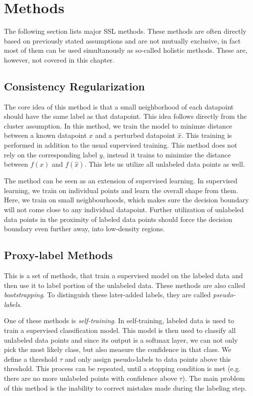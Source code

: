 \section{Methods}
\label{sec:SslMethods}

The following section lists major SSL methods. These methods are often directly based on previously stated assumptions and are not mutually exclusive, in fact most of them can be used simultanously as so-called holistic methods. These are, however, not covered in this chapter.


\subsection{Consistency Regularization}

The core idea of this method is that a small neighborhood of each datapoint should have the same label as that datapoint. This idea follows directly from the cluster assumption. In this method, we train the model to minimze distance between a known datapoint $x$ and a perturbed datapoint $\hat{x}$. This training is performed in addition to the usual supervised training. This method does not rely on the corresponding label $y$, instead it trains to minimize the distance between $f(x)$ and $f(\hat{x})$. This lets us utilize all unlabeled data points as well.

The method can be seen as an extension of supervised learning. In supervised learning, we train on individual points and learn the overall shape from them. Here, we train on small neighbourhoods, which makes sure the decision boundary will not come close to any individual datapoint. Further utilization of unlabeled data points in the proximity of labeled data points should force the decision boundary even further away, into low-density regions.


\subsection{Proxy-label Methods}

This is a set of methods, that train a supervised model on the labeled data and then use it to label portion of the unlabeled data. These methods are also called \emph{bootstrapping}. To distinguish these later-added labels, they are called \emph{pseudo-labels}.

One of these methods is \emph{self-training}. In self-training, labeled data is used to train a supervised classification model. This model is then used to classify all unlabeled data points and since its output is a softmax layer, we can not only pick the most likely class, but also measure the confidence in that class. We define a threshold $\tau$ and only assign pseudo-labels to data points above this threshold. This process can be repeated, until a stopping condition is met (e.g. there are no more unlabeled points with confidence above $\tau$). The main problem of this method is the inability to correct mistakes made during the labeling step.

